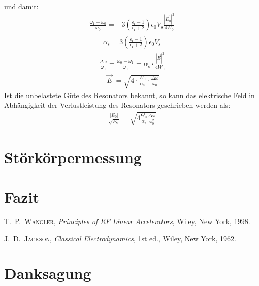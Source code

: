 \documentclass[11pt, a4paper]{scrbook}
\newcommand{\ve}{\vec{E}}
\begin{document}
	und damit:
	\begin{align}
		\frac{\omega_1 - \omega_0}{\omega_0} = - 3 \left( \frac{\epsilon_\mathrm{r} - 1}{\epsilon_\mathrm{r} + 2} \right) \epsilon_0 V_\mathrm{s} \frac{|\ve_0|^2}{4 W_0}
	\end{align}
	\begin{align}
		\alpha_\mathrm{s} = 3 \left( \frac{\epsilon_\mathrm{r} - 1}{\epsilon_\mathrm{r} + 2} \right) \epsilon_0 V_\mathrm{s}
	\end{align}
	\begin{align}
		\frac{\Delta \omega}{\omega_0} = \frac{\omega_0 - \omega_1}{\omega_0} = \alpha_\mathrm{s} \cdot \frac{|\ve|^2}{4 W_0}
	\end{align}
	\begin{align}
		|\ve| = \sqrt{4 \cdot \frac{W_0}{\alpha_\mathrm{s}} \cdot \frac{\Delta \omega}{\omega_0}}
	\end{align}
	Ist die unbelastete Güte des Resonators bekannt, so kann das elektrische Feld in Abhängigkeit der Verlustleistung des Resonators geschrieben werden als:
	\begin{align}
		\frac{|E_0|}{\sqrt{P_\mathrm{V}}} = \sqrt{4 \frac{Q_0}{\alpha_s} \frac{\Delta \omega}{\omega_0^2}}
	\end{align}
	
	
	\chapter{Störkörpermessung}
	
	\chapter{Fazit}
	
	\backmatter
		
	\begin{thebibliography}{19}
		\textsc{T.\ P.\ Wangler},
		\emph{Principles of RF Linear Accelerators},
		Wiley, New York, 1998.
	
		\textsc{J.\ D.\ Jackson},
		\emph{Classical Electrodynamics}, 1st ed.,
		Wiley, New York, 1962.
	
	\end{thebibliography}
	
	\chapter{Danksagung}
	
	\listoffigures
	\listoftables
	
\end{document}
